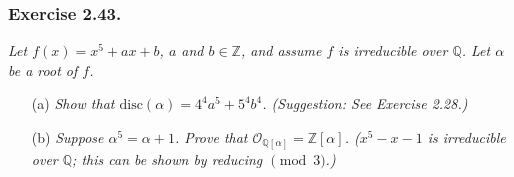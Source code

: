 \documentclass{article}
\begin{document}



\subsubsection*{Exercise 2.43.}
\emph{Let $f(x) = x^5+ax+b$, $a$ and $b \in \mathbb{Z}$,
and assume $f$ is irreducible over $\mathbb{Q}$.
Let $\alpha$ be a root of $f$.}
\begin{enumerate}
\item[(a)]
  \emph{Show that $\textrm{disc}(\alpha) = 4^4 a^5 + 5^4 b^4$. (Suggestion: See Exercise 2.28.)}

\item[(b)]
  \emph{Suppose $\alpha^5=\alpha+1$.
  Prove that $\mathcal{O}_{\mathbb{Q}[\alpha]} = \mathbb{Z}[\alpha]$.
  ($x^5 - x - 1$ is irreducible over $\mathbb{Q}$;
  this can be shown by reducing $\pmod{3}$.)} \\
\end{enumerate}
\end{document}
